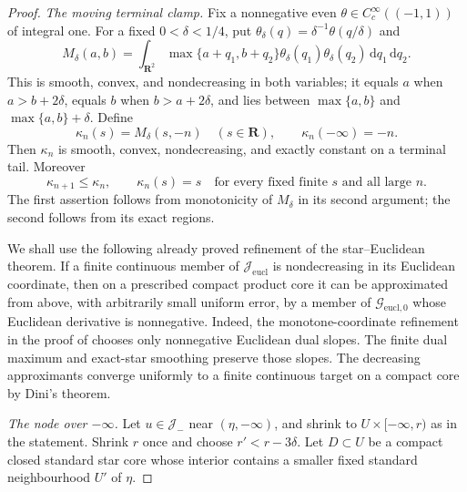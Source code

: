 \begin{proof}
\medskip\noindent
\emph{The moving terminal clamp.}
Fix a nonnegative even
$\theta\in C^\infty_c((-1,1))$ of integral one.  For a fixed
$0<\delta<1/4$, put $\theta_\delta(q)=\delta^{-1}\theta(q/\delta)$ and
\begin{equation}
 M_\delta(a,b)=\int_{\mathbf R^2}
   \max\{a+q_1,b+q_2\}\theta_\delta(q_1)
       \theta_\delta(q_2)\,\mathrm dq_1\,\mathrm dq_2.
\label{eq:p071-star-infinite-collar-regularized-maximum}
\end{equation}
This is smooth, convex, and nondecreasing in both variables; it equals
$a$ when $a>b+2\delta$, equals $b$ when $b>a+2\delta$, and lies between
$\max\{a,b\}$ and $\max\{a,b\}+\delta$.  Define
\begin{equation}
 \kappa_n(s)=M_\delta(s,-n)\quad(s\in\mathbf R),
 \qquad \kappa_n(-\infty)=-n.
\label{eq:p071-star-infinite-collar-clamp}
\end{equation}
Then $\kappa_n$ is smooth, convex, nondecreasing, and exactly constant on
a terminal tail.  Moreover
\begin{equation}
 \kappa_{n+1}\leq\kappa_n,
 \qquad
 \kappa_n(s)=s\quad\text{for every fixed finite $s$ and all large $n$}.
\label{eq:p071-star-infinite-collar-clamp-order}
\end{equation}
The first assertion follows from monotonicity of $M_\delta$ in its second
argument; the second follows from its exact regions.

We shall use the following already proved refinement of the
star--Euclidean theorem.  If a finite continuous member of
$\mathcal J_{\mathrm{eucl}}$ is nondecreasing in its Euclidean coordinate,
then on a prescribed compact product core it can be approximated from
above, with arbitrarily small uniform error, by a member of
$\mathcal G_{\mathrm{eucl},0}$ whose Euclidean derivative is nonnegative.
Indeed, the monotone-coordinate refinement in the proof of
 chooses only
nonnegative Euclidean dual slopes.  The finite dual maximum and exact-star
smoothing preserve those slopes.  The decreasing approximants converge
uniformly to a finite continuous target on a compact core by Dini's
theorem.

\medskip\noindent
\emph{The node over $-\infty$.}
Let $u\in\mathcal J_-$ near $(\eta,-\infty)$, and shrink to
$U\times[-\infty,r)$ as in the statement.  Shrink $r$ once and choose
$r'<r-3\delta$.  Let $D\subset U$ be a compact closed standard star core
whose interior contains a smaller fixed standard neighbourhood $U'$ of
$\eta$.


\end{proof}
